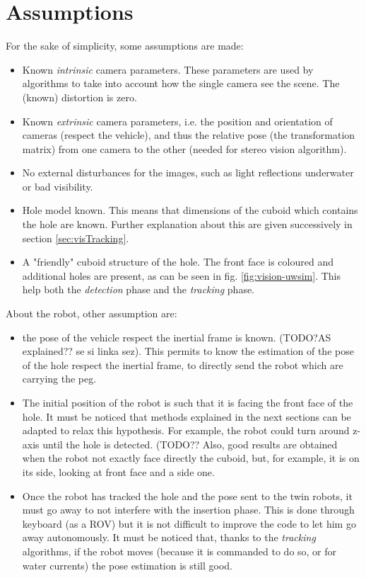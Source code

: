 \section{Assumptions}
\label{sec:visioAssumption} %
For the sake of simplicity, some assumptions are made:
\begin{itemize}
	\item Known \textit{intrinsic} camera parameters. These parameters are used by algorithms to take into account how the single camera see the scene. The (known) distortion is zero.
	\item Known \textit{extrinsic} camera parameters, i.e. the position and orientation of cameras (respect the vehicle), and thus the relative pose (the transformation matrix) from one camera to the other (needed for stereo vision algorithm).
	\item No external disturbances for the images, such as light reflections underwater or bad visibility.
	\item Hole model known. This means that dimensions of the cuboid which contains the hole are known. Further explanation about this are given successively in section \ref{sec:visTracking}.
	\item A "friendly" cuboid structure of the hole. The front face is coloured and additional holes are present, as can be seen in fig. \ref{fig:vision-uwsim}. This help both the \textit{detection} phase and the \textit{tracking} phase.
\end{itemize}
About the robot, other assumption are:
\begin{itemize}
	\item the pose of the vehicle respect the inertial frame is known. (TODO?AS explained?? se si linka sez). This permits to know the estimation of the pose of the hole respect the inertial frame, to directly send the robot which are carrying the peg.
	\item The initial position of the robot is such that it is facing the front face of the hole. It must be noticed that methods explained in the next sections can be adapted to relax this hypothesis. For example, the robot could turn around z-axis until the hole is detected. (TODO?? %
	 Also, good results are obtained when the robot not exactly face directly the cuboid, but, for example, it is on its side, looking at front face and a side one.
	\item Once the robot has tracked the hole and the pose sent to the twin robots, it must go away to not interfere with the insertion phase. This is done through keyboard (as a ROV) but it is not difficult to improve the code to let him go away autonomously. It must be noticed that, thanks to the \textit{tracking} algorithms, if the robot moves (because it is commanded to do so, or for water currents) the pose estimation is still good. 
\end{itemize}

